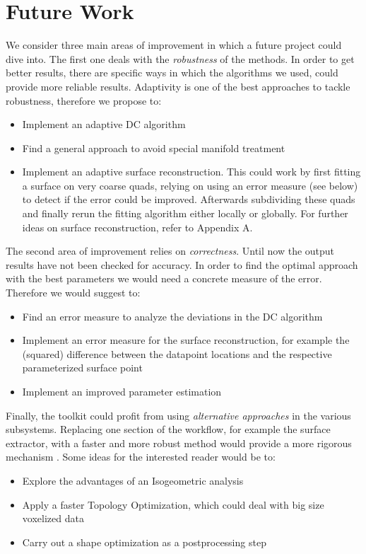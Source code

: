 \section{Future Work}
\label{sec:Future}
We consider three main areas of improvement in which a future project could dive into. The first one deals with the \textit{robustness} of the methods.  In order to get better results, there are specific ways in which the algorithms we used, could provide more reliable results. Adaptivity is one of the best approaches to tackle robustness, therefore we propose to:  
\begin{itemize}
\item Implement an adaptive DC algorithm
\item Find a general approach to  avoid special manifold treatment
\item Implement an adaptive surface reconstruction. This could work by first fitting a surface on very coarse quads, relying on using an error measure (see below) to detect if the error could be improved. Afterwards  subdividing these quads and finally rerun the fitting algorithm either locally or globally. For further ideas on surface reconstruction, refer to Appendix A.

\end{itemize}
The second area of improvement relies on \textit{correctness}. Until now the output results have not been checked for accuracy. In order to find the optimal approach with the best parameters we would need a concrete measure of the error. Therefore we would suggest to:
\begin{itemize}
\item Find an error measure to analyze the deviations in the DC algorithm
\item Implement an error measure for the surface reconstruction, for example the (squared) difference between the datapoint locations and the respective parameterized surface point
\item Implement an improved parameter estimation %
\end{itemize}
Finally, the toolkit could profit from using \textit{alternative approaches} in the various subsystems. Replacing one section of the workflow, for example the surface extractor, with a faster and more robust method would provide a more rigorous mechanism . Some ideas for the interested reader would be to:
\begin{itemize}
\item Explore the advantages of an Isogeometric analysis

\item Apply a faster Topology Optimization, which could deal with big size voxelized data

\item Carry out a shape optimization as a postprocessing step
\end{itemize}
